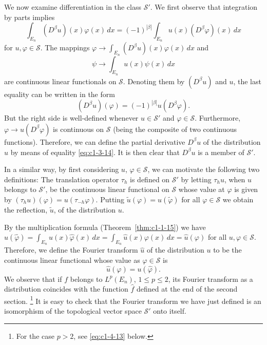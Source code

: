 We now examine differentiation in the class $\mathscr{S}'$. We first observe
that integration by parts implies
\[
\int_{E_{n}}(D^{\beta}u)(x)\varphi(x)\,dx=(-1)^{|\beta|}\int_{E_{n}}u(x)(D^{\beta}\varphi)(x)\,dx
\]
for $u, \varphi \in \mathscr{S}$. The mappings
$\varphi \to \int_{E_{n}} (D^{\beta}u)(x)\varphi(x) \, dx$ and
\[
\psi\to\int_{E_{n}}u(x)\psi(x)\,dx
\]
are continuous linear functionals on $\mathscr{S}$. Denoting them by
$(D^{\beta}u)$ and $u$, the last equality can be written in the form
\begin{equation}\label{eq:c1-3-14}
(D^{\beta}u)(\varphi)=(-1)^{|\beta|}u(D^{\beta}\varphi).
\end{equation}
But the right side is well-defined whenever $u \in \mathscr{S}'$ and
$\varphi \in \mathscr{S}$. Furthermore, $\varphi \to u(D^{\beta}\varphi)$ is
continuous on $\mathscr{S}$ (being the composite of two continuous
functions). Therefore, we can define the partial derivative $D^{\beta}u$ of
the distribution $u$ by means of equality \eqref{eq:c1-3-14}. It is then clear
that $D^{\beta}u$ is a member of $\mathscr{S}'$.

In a similar way, by first considering $u$, $\varphi \in \mathscr{S}$, we can
motivate the following two definitions: The translation operator $\tau_{h}$ is
defined on $\mathscr{S}'$ by letting $\tau_{h}u$, when $u$ belongs to
$\mathscr{S}'$, be the continuous linear functional on $\mathscr{S}$ whose
value at $\varphi$ is given by $(\tau_{h}u)(\varphi) = u(\tau_{-h}\varphi)$.
Putting $\tilde{u}(\varphi) = u(\tilde{\varphi})$ for all
$\varphi \in \mathscr{S}$ we obtain the reflection, $\tilde{u}$, of the
distribution $u$.

By the multiplication formula (Theorem~\ref{thm:c1-1-15}) we have
$u(\hat{\varphi}) = \int_{E_{n}} u(x)\hat{\varphi}(x) \, dx = \int_{E_{n}} \hat{u}(x)\varphi(x) \, dx = \hat{u}(\varphi)$
for all $u, \varphi \in \mathscr{S}$. Therefore, we define the Fourier
transform $\hat{u}$ of the distribution $u$ to be the continuous linear
functional whose value as $\varphi \in \mathscr{S}$ is
\begin{equation}\label{eq:c1-3-15}
\hat{u}(\varphi)=u(\hat{\varphi}).
\end{equation}
We observe that if $f$ belongs to $L^{p}(E_{n})$, $1 \leq p \leq 2$, its
Fourier transform as a distribution coincides with the function $\hat{f}$
defined at the end of the second section.%
\footnote{For the case $p > 2$, see \eqref{eq:c1-4-13} below.}
It is easy to check that the Fourier transform we have just defined is an
isomorphism of the topological vector space $\mathscr{S}'$ onto itself.

